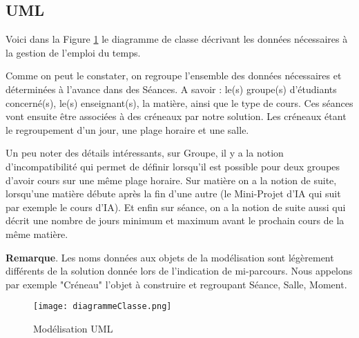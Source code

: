 \subsection{UML}

Voici dans la Figure \ref{fig:uml} le diagramme de classe décrivant les données
nécessaires à la gestion de l'emploi du temps.

Comme on peut le constater, on regroupe l'ensemble des données nécessaires et
déterminées à l'avance dans des Séances. A savoir : le(s) groupe(s) d'étudiants
concerné(s), le(s) enseignant(s), la matière, ainsi que le type de cours.
Ces séances vont ensuite être associées à des créneaux par notre solution.
Les créneaux étant le regroupement d'un jour, une plage horaire et une salle.

Un peu noter des détails intéressants, sur Groupe, il y a la notion
d'incompatibilité qui permet de définir lorsqu'il est possible pour deux groupes
d'avoir cours sur une même plage horaire. Sur matière on a la notion de suite,
lorsqu'une matière débute après la fin d'une autre (le Mini-Projet d'IA qui suit
par exemple le cours d'IA).
Et enfin sur séance, on a la notion de suite aussi qui décrit une nombre de
jours minimum et maximum avant le prochain cours de la même matière.

\textbf{Remarque}. Les noms données aux objets de la modélisation sont
légèrement différents de la solution donnée lors de l'indication de
mi-parcours. Nous appelons par exemple "Créneau" l'objet à construire et
regroupant Séance, Salle, Moment.

\begin{landscape}

    \begin{figure}[t]
        \texttt{[image: diagrammeClasse.png]}
            \caption{\label{fig:uml} Modélisation UML}
    \end{figure}

\end{landscape}
